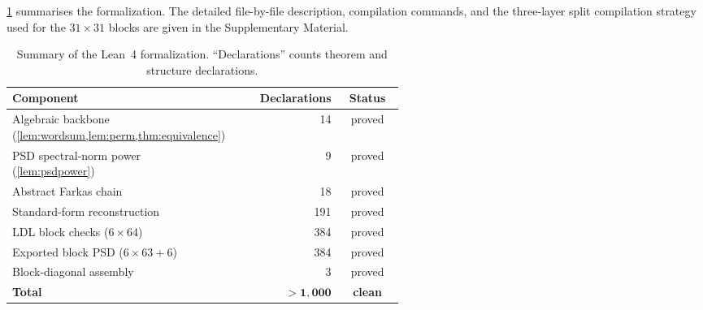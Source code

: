 \cref{tab:lean} summarises the formalization.  The detailed
file-by-file description, compilation commands, and the three-layer
split compilation strategy used for the $31\times 31$ blocks are
given in the Supplementary Material.

\begin{table}[ht]
\centering
\caption{Summary of the Lean~4 formalization.  ``Declarations''
  counts theorem and structure declarations.}
\label{tab:lean}
\renewcommand{\arraystretch}{1.25}
\begin{tabular}{@{}p{0.56\linewidth}rc@{}}
\toprule
\textbf{Component} & \textbf{Declarations} & \textbf{Status} \\
\midrule
Algebraic backbone
  (\cref{lem:wordsum,lem:perm,thm:equivalence})
                           & 14  & proved \\
PSD spectral-norm power (\cref{lem:psdpower})
                           &  9  & proved \\
Abstract Farkas chain      & 18  & proved \\
Standard-form reconstruction
                           & 191 & proved \\
LDL block checks ($6\times 64$)
                           & 384 & proved \\
Exported block PSD ($6\times 63+6$)
                           & 384 & proved \\
Block-diagonal assembly    &   3 & proved \\
\midrule
  \textbf{Total}
  & $\mathbf{>1{,}000}$
  & \textbf{clean} \\
\bottomrule
\end{tabular}
\end{table}

